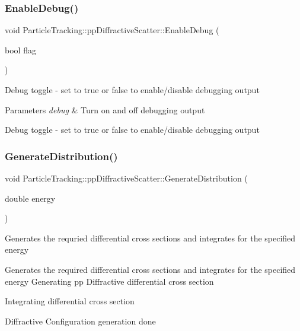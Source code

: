 \subsubsection{\texorpdfstring{Enable\+Debug()}{EnableDebug()}}
{\footnotesize\ttfamily void Particle\+Tracking\+::pp\+Diffractive\+Scatter\+::\+Enable\+Debug (\begin{DoxyParamCaption}\item[{bool}]{flag }\end{DoxyParamCaption})}

Debug toggle -\/ set to true or false to enable/disable debugging output 
\begin{DoxyParams}{Parameters}
{\em debug} & Turn on and off debugging output\\
\hline
\end{DoxyParams}
Debug toggle -\/ set to true or false to enable/disable debugging output \mbox{\label{classParticleTracking_1_1ppDiffractiveScatter_adaec9271ebbbc79bf484f5bbd7e89605}} 
\subsubsection{\texorpdfstring{Generate\+Distribution()}{GenerateDistribution()}}
{\footnotesize\ttfamily void Particle\+Tracking\+::pp\+Diffractive\+Scatter\+::\+Generate\+Distribution (\begin{DoxyParamCaption}\item[{double}]{energy }\end{DoxyParamCaption})}

Generates the requried differential cross sections and integrates for the specified energy

Generates the required differential cross sections and integrates for the specified energy Generating pp Diffractive differential cross section

Integrating differential cross section

Diffractive Configuration generation done \mbox{\label{classParticleTracking_1_1ppDiffractiveScatter_aea40467446793fb960701530018efdc5}} 
